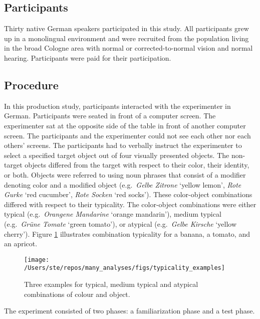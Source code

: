 \documentclass[
  12pt,
]{article}
\begin{document}
\hypertarget{participants}{%
\subsection{Participants}\label{participants}}

Thirty native German speakers participated in this study.
All participants grew up in a monolingual environment and were recruited from the population living in the broad Cologne area with normal or corrected-to-normal vision and normal hearing.
Participants were paid for their participation.

\hypertarget{procedure}{%
\subsection{Procedure}\label{procedure}}

In this production study, participants interacted with the experimenter in German.
Participants were seated in front of a computer screen.
The experimenter sat at the opposite side of the table in front of another computer screen.
The participants and the experimenter could not see each other nor each others' screens.
The participants had to verbally instruct the experimenter to select a specified target object out of four visually presented objects.
The non-target objects differed from the target with respect to their color, their identity, or both.
Objects were referred to using noun phrases that consist of a modifier denoting color and a modified object (e.g.~\emph{Gelbe Zitrone} `yellow lemon', \emph{Rote Gurke} `red cucumber', \emph{Rote Socken} `red socks').
These color-object combinations differed with respect to their typicality.
The color-object combinations were either typical (e.g.~\emph{Orangene Mandarine} `orange mandarin'), medium typical (e.g.~\emph{Grüne Tomate} `green tomato'), or atypical (e.g.~\emph{Gelbe Kirsche} `yellow cherry').
Figure \ref{fig:image0} illustrates combination typicality for a banana, a tomato, and an apricot.

\begin{figure}[tbp]

{\centering \texttt{[image: /Users/ste/repos/many\_analyses/figs/typicality\_examples]} 

}

\caption{Three examples for typical, medium typical and atypical combinations of colour and object.}\label{fig:image0}
\end{figure}

The experiment consisted of two phases: a familiarization phase and a test phase.
\end{document}

